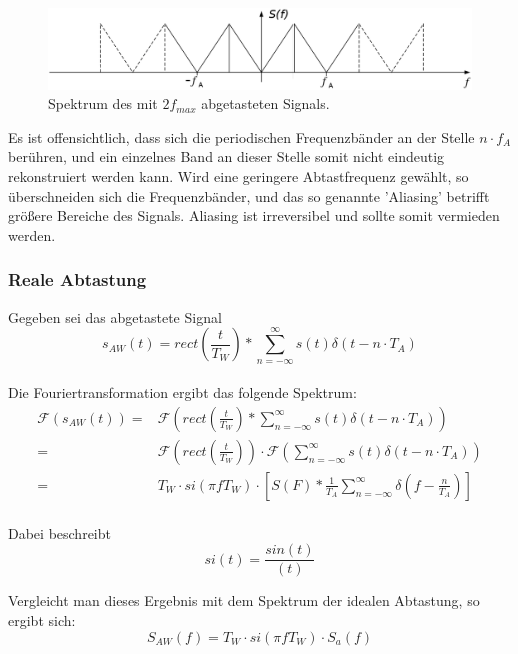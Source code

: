 \begin{figure}[h!]
\centering
\includegraphics[scale=0.3]{images/2f.png}
\caption{Spektrum des mit $2f_{max}$ abgetasteten Signals.}
\label{2fsig}
\end{figure}
\newpage

Es ist offensichtlich, dass sich die periodischen Frequenzbänder an der Stelle $n \cdot f_A$ berühren, und ein einzelnes Band an dieser Stelle somit nicht eindeutig rekonstruiert werden kann. Wird eine geringere Abtastfrequenz gewählt, so überschneiden sich die Frequenzbänder, und das so genannte 'Aliasing' betrifft größere Bereiche des Signals. Aliasing ist irreversibel und sollte somit vermieden werden.

\subsubsection{Reale Abtastung}
\label{3.2.2}
Gegeben sei das abgetastete Signal\\
$$s_{AW}(t) = rect\left(\frac{t}{T_W}\right) * \sum_{n=-\infty}^{\infty} s(t) \delta (t - n\cdot T_A)$$\\
Die Fouriertransformation ergibt das folgende Spektrum:\\
\begin{equation}
\begin{aligned}
\mathcal{F}(s_{AW}(t)) = &  \mathcal{F}(rect\left(\frac{t}{T_W}\right) * \sum_{n=-\infty}^{\infty} s(t) \delta (t - n\cdot T_A)) \\
= & \mathcal{F}(rect\left(\frac{t}{T_W}\right)) \cdot \mathcal{F}(\sum_{n=-\infty}^{\infty} s(t) \delta (t - n\cdot T_A)) \\
= & T_W \cdot si(\pi f T_W) \cdot \left[ S(F) * \frac{1}{T_A} 
\sum_{n=-\infty}^{\infty} \delta \left(f - \frac{n}{T_A}\right) \right] \\
\end{aligned}
\end{equation}

Dabei beschreibt $$si(t) = \frac{sin(t)}{(t)}$$

Vergleicht man dieses Ergebnis mit dem Spektrum der idealen Abtastung, so ergibt sich:
$$S_{AW}(f) = T_W \cdot si(\pi f T_W) \cdot S_{a}(f)$$

